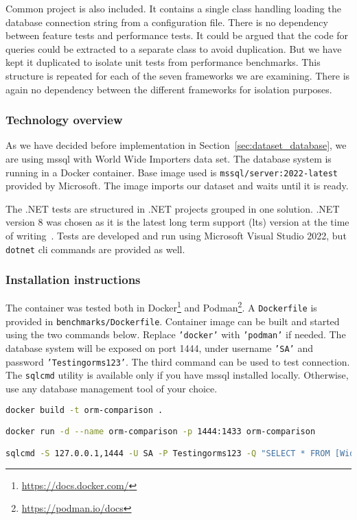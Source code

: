 Common project is also included. It contains a single class handling loading the database connection string from a configuration file. There is no dependency between feature tests and performance tests. It could be argued that the code for queries could be extracted to a separate class to avoid duplication. But we have kept it duplicated to isolate unit tests from performance benchmarks. This structure is repeated for each of the seven frameworks we are examining. There is again no dependency between the different frameworks for isolation purposes.

\subsubsection{Technology overview}
As we have decided before implementation in Section~\ref{sec:dataset_database}, we are using \acrshort{mssql} with World Wide Importers data set. The database system is running in a Docker container. Base image used is \texttt{mssql/server:2022-latest}~\cite{mssqlDocker} provided by Microsoft. The image imports our dataset and waits until it is ready.

The .NET tests are structured in .NET projects grouped in one solution. .NET version 8 was chosen as it is the latest long term support (\acrshort{lts}) version at the time of writing~\cite{NETversions}. Tests are developed and run using Microsoft Visual Studio 2022, but \texttt{dotnet} \acrshort{cli} commands are provided as well.

\subsubsection{Installation instructions}
The container was tested both in Docker\footnote{\url{https://docs.docker.com/}} and Podman\footnote{\url{https://podman.io/docs}}. A \texttt{Dockerfile} is provided in \texttt{benchmarks/Dockerfile}. Container image can be built and started using the two commands below. Replace \texttt{'docker'} with \texttt{'podman'} if needed. The database system will be exposed on port 1444, under username \texttt{'SA'} and password \texttt{'Testingorms123'}.
The third command can be used to test connection. The \texttt{sqlcmd} utility is available only if you have \acrshort{mssql} installed locally. Otherwise, use any database management tool of your choice.

\begin{lstlisting}[language=sh]
docker build -t orm-comparison .

docker run -d --name orm-comparison -p 1444:1433 orm-comparison

sqlcmd -S 127.0.0.1,1444 -U SA -P Testingorms123 -Q "SELECT * FROM [WideWorldImporters].[Purchasing].[PurchaseOrders]"
\end{lstlisting}

